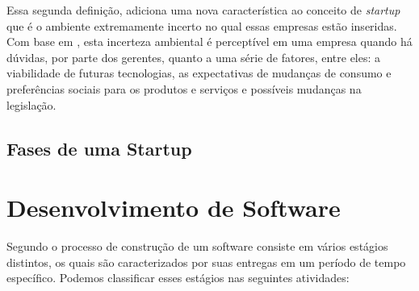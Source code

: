 Essa segunda definição, adiciona uma nova característica ao conceito de
\textit{startup} que é o ambiente extremamente incerto no qual essas empresas
estão inseridas. Com base em  , esta incerteza
ambiental é perceptível em uma empresa quando há dúvidas, por parte dos gerentes,
quanto a uma série de fatores, entre eles: a viabilidade de futuras tecnologias,
as expectativas de mudanças de consumo e preferências sociais para os produtos
e serviços e possíveis mudanças na legislação.

\subsection{Fases de uma Startup}

\section{Desenvolvimento de Software}

Segundo  o processo de construção de um software consiste
em vários estágios distintos, os quais são caracterizados por suas entregas em um
período de tempo específico. Podemos classificar esses estágios nas seguintes
atividades:

